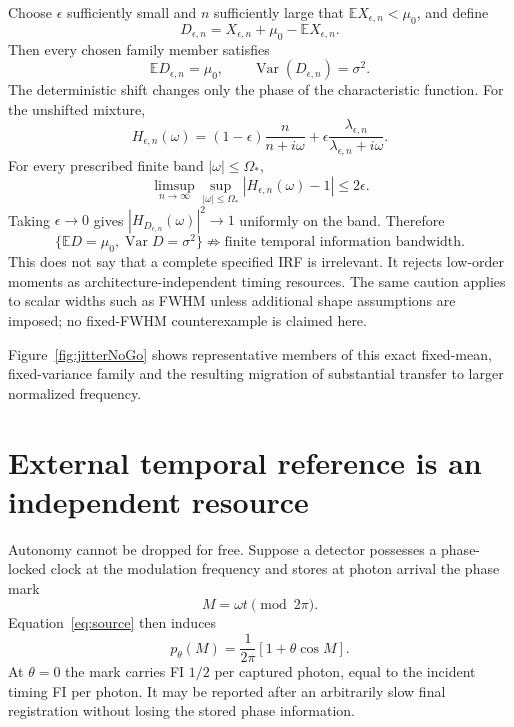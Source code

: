 \documentclass[aps,prapplied,preprint,nofootinbib]{revtex4-2}
\begin{document}
Choose $\epsilon$ sufficiently small and $n$ sufficiently large that $\mathbb E X_{\epsilon,n}<\mu_0$, and define
\begin{equation}
D_{\epsilon,n}=X_{\epsilon,n}
+\mu_0-\mathbb E X_{\epsilon,n}.
\end{equation}
Then every chosen family member satisfies
\begin{equation}
\boxed{
\mathbb E D_{\epsilon,n}=\mu_0,
\qquad
\operatorname{Var}(D_{\epsilon,n})=\sigma^2.}
\end{equation}
The deterministic shift changes only the phase of the characteristic function. For the unshifted mixture,
\begin{equation}
H_{\epsilon,n}(\omega)
=(1-\epsilon)\frac{n}{n+i\omega}
+\epsilon\frac{\lambda_{\epsilon,n}}{\lambda_{\epsilon,n}+i\omega}.
\end{equation}
For every prescribed finite band $|\omega|\le\Omega_*$,
\begin{equation}
\limsup_{n\to\infty}
\sup_{|\omega|\le\Omega_*}
|H_{\epsilon,n}(\omega)-1|
\le2\epsilon.
\end{equation}
Taking $\epsilon\to0$ gives $|H_{D_{\epsilon,n}}(\omega)|^2\to1$ uniformly on the band. Therefore
\begin{equation}
\boxed{
\{\mathbb E D=\mu_0,\operatorname{Var}D=\sigma^2\}
\not\Rightarrow
\text{finite temporal information bandwidth}.}
\end{equation}
This does not say that a complete specified IRF is irrelevant. It rejects low-order moments as architecture-independent timing resources. The same caution applies to scalar widths such as FWHM unless additional shape assumptions are imposed; no fixed-FWHM counterexample is claimed here.

Figure~\ref{fig:jitterNoGo} shows representative members of this exact fixed-mean, fixed-variance family and the resulting migration of substantial transfer to larger normalized frequency.



\section{External temporal reference is an independent resource}
\label{sec:clock}

Autonomy cannot be dropped for free. Suppose a detector possesses a phase-locked clock at the modulation frequency and stores at photon arrival the phase mark
\begin{equation}
M=\omega t\pmod{2\pi}.
\end{equation}
Equation~\eqref{eq:source} then induces
\begin{equation}
p_\theta(M)=\frac{1}{2\pi}[1+\theta\cos M].
\end{equation}
At $\theta=0$ the mark carries FI $1/2$ per captured photon, equal to the incident timing FI per photon. It may be reported after an arbitrarily slow final registration without losing the stored phase information.
\end{document}
